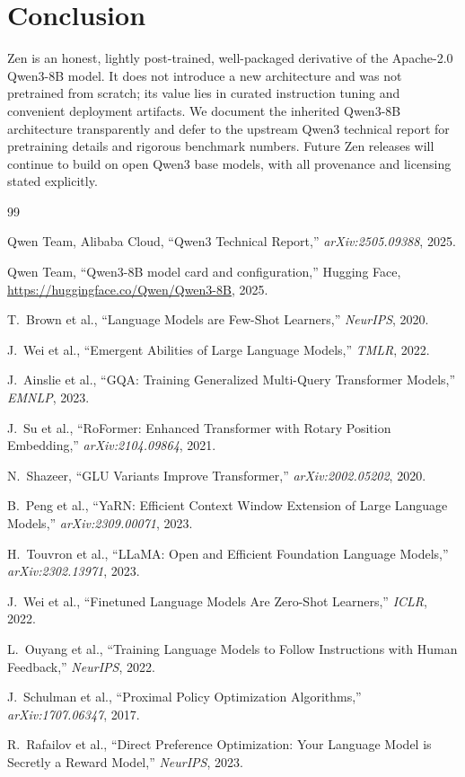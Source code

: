 \documentclass[11pt,a4paper]{article}
\begin{document}
\section{Conclusion}

Zen is an honest, lightly post-trained, well-packaged derivative of the Apache-2.0 Qwen3-8B model.
It does not introduce a new architecture and was not pretrained from scratch; its value lies in
curated instruction tuning and convenient deployment artifacts. We document the inherited Qwen3-8B
architecture transparently and defer to the upstream Qwen3 technical report for pretraining details
and rigorous benchmark numbers. Future Zen releases will continue to build on open Qwen3 base models,
with all provenance and licensing stated explicitly.

\begin{thebibliography}{99}

Qwen Team, Alibaba Cloud, ``Qwen3 Technical Report,'' \textit{arXiv:2505.09388}, 2025.

Qwen Team, ``Qwen3-8B model card and configuration,'' Hugging Face,
\url{https://huggingface.co/Qwen/Qwen3-8B}, 2025.

T.~Brown et al., ``Language Models are Few-Shot Learners,'' \textit{NeurIPS}, 2020.

J.~Wei et al., ``Emergent Abilities of Large Language Models,'' \textit{TMLR}, 2022.

J.~Ainslie et al., ``GQA: Training Generalized Multi-Query Transformer Models,''
\textit{EMNLP}, 2023.

J.~Su et al., ``RoFormer: Enhanced Transformer with Rotary Position Embedding,''
\textit{arXiv:2104.09864}, 2021.

N.~Shazeer, ``GLU Variants Improve Transformer,'' \textit{arXiv:2002.05202}, 2020.

B.~Peng et al., ``YaRN: Efficient Context Window Extension of Large Language Models,''
\textit{arXiv:2309.00071}, 2023.

H.~Touvron et al., ``LLaMA: Open and Efficient Foundation Language Models,''
\textit{arXiv:2302.13971}, 2023.

J.~Wei et al., ``Finetuned Language Models Are Zero-Shot Learners,'' \textit{ICLR}, 2022.

L.~Ouyang et al., ``Training Language Models to Follow Instructions with Human Feedback,''
\textit{NeurIPS}, 2022.

J.~Schulman et al., ``Proximal Policy Optimization Algorithms,'' \textit{arXiv:1707.06347}, 2017.

R.~Rafailov et al., ``Direct Preference Optimization: Your Language Model is Secretly a Reward
Model,'' \textit{NeurIPS}, 2023.

\end{thebibliography}
\end{document}
